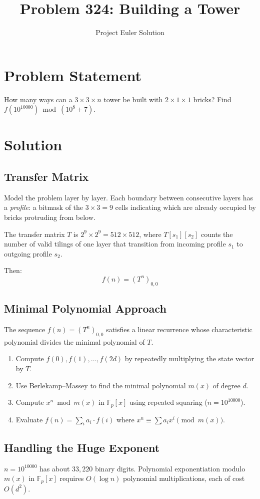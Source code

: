 \documentclass[12pt]{article}
\title{Problem 324: Building a Tower}
\author{Project Euler Solution}
\date{}
\begin{document}
\maketitle

\section{Problem Statement}
How many ways can a $3\times 3 \times n$ tower be built with $2\times 1\times 1$ bricks?
Find $f(10^{10000}) \bmod (10^8+7)$.

\section{Solution}

\subsection{Transfer Matrix}
Model the problem layer by layer. Each boundary between consecutive layers has a \emph{profile}: a bitmask of the $3\times 3 = 9$ cells indicating which are already occupied by bricks protruding from below.

The transfer matrix $T$ is $2^9 \times 2^9 = 512 \times 512$, where $T[s_1][s_2]$ counts the number of valid tilings of one layer that transition from incoming profile $s_1$ to outgoing profile $s_2$.

Then:
\[
f(n) = (T^n)_{0,0}
\]

\subsection{Minimal Polynomial Approach}
The sequence $f(n) = (T^n)_{0,0}$ satisfies a linear recurrence whose characteristic polynomial divides the minimal polynomial of $T$.

\begin{enumerate}
\item Compute $f(0), f(1), \ldots, f(2d)$ by repeatedly multiplying the state vector by $T$.
\item Use Berlekamp--Massey to find the minimal polynomial $m(x)$ of degree $d$.
\item Compute $x^n \bmod m(x)$ in $\mathbb{F}_p[x]$ using repeated squaring ($n = 10^{10000}$).
\item Evaluate $f(n) = \sum_i a_i \cdot f(i)$ where $x^n \equiv \sum a_i x^i \pmod{m(x)}$.
\end{enumerate}

\subsection{Handling the Huge Exponent}
$n = 10^{10000}$ has about $33{,}220$ binary digits. Polynomial exponentiation modulo $m(x)$ in $\mathbb{F}_p[x]$ requires $O(\log n)$ polynomial multiplications, each of cost $O(d^2)$.
\end{document}
